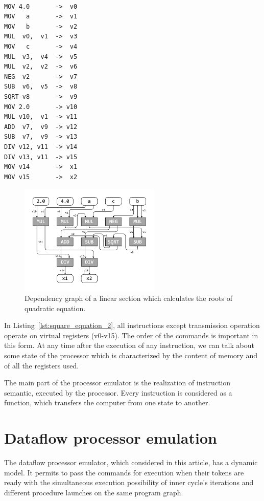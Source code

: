\documentclass[
11pt,%
tightenlines,%
twoside,%
onecolumn,%
nofloats,%
nobibnotes,%
nofootinbib,%
superscriptaddress,%
noshowpacs,%
centertags]%
{revtex4}
\begin{document}
\

\begin{lstlisting}[caption={Pseudocode for calculating the roots of  quadratic equation.},label={lst:square_equation_2}]
MOV 4.0       ->  v0
MOV   a       ->  v1
MOV   b       ->  v2
MUL  v0,  v1  ->  v3
MOV   c       ->  v4
MUL  v3,  v4  ->  v5
MUL  v2,  v2  ->  v6
NEG  v2       ->  v7
SUB  v6,  v5  ->  v8
SQRT v8       ->  v9
MOV 2.0       -> v10
MUL v10,  v1  -> v11
ADD  v7,  v9  -> v12
SUB  v7,  v9  -> v13
DIV v12, v11  -> v14
DIV v13, v11  -> v15
MOV v14       ->  x1
MOV v15       ->  x2
\end{lstlisting}

\begin{figure}[h]
\includegraphics[width=0.60\textwidth]{pics/def_use.pdf}
\caption{Dependency graph of a linear section which calculates the roots of quadratic equation.}\label{fig:def_use}
\end{figure}

In Listing~\ref{lst:square_equation_2}, all instructions except transmission operation operate on virtual registers (v0-v15).
The order of the commands is important in this form.
At any time after the execution of any instruction, we can talk about some state of the processor which is characterized by the content of memory and of all the registers used.

The main part of the processor emulator is the realization of instruction semantic, executed by the processor.
Every instruction is considered as a function, which transfers the computer from one state to another.

\section{Dataflow processor emulation}

The dataflow processor emulator, which considered in this article, has a dynamic model.
It permits to pass the commands for execution when their tokens are ready with the simultaneous execution possibility of inner cycle’s iterations and different procedure launches on the same program graph.
\end{document}
